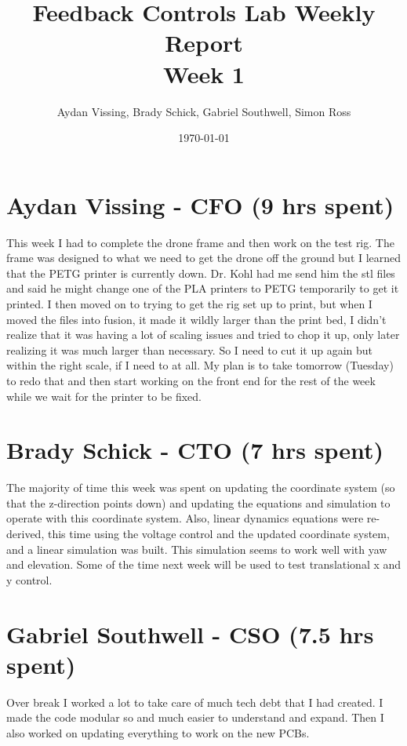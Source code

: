 \documentclass[12pt, titlepage]{article}
\title{Feedback Controls Lab Weekly Report \\ \normalsize{Week 1}}
\author{Aydan Vissing, Brady Schick, Gabriel Southwell, Simon Ross}
\date{\today}
\begin{document}
\maketitle

\section*{Aydan Vissing - CFO (9 hrs spent)}

This week I had to complete the drone frame and then work on the test rig. The frame was designed to what we need to get the drone off the ground but I learned that the PETG printer is currently down. Dr. Kohl had me send him the stl files and said he might change one of the PLA printers to PETG temporarily to get it printed. I then moved on to trying to get the rig set up to print, but when I moved the files into fusion, it made it wildly larger than the print bed, I didn't realize that it was having a lot of scaling issues and tried to chop it up, only later realizing it was much larger than necessary. So I need to cut it up again but within the right scale, if I need to at all. My plan is to take tomorrow (Tuesday) to redo that and then start working on the front end for the rest of the week while we wait for the printer to be fixed.

\section*{Brady Schick - CTO (7 hrs spent)}

The majority of time this week was spent on updating the coordinate system (so that the z-direction points down) and 
updating the equations and simulation to operate with this coordinate system. Also, linear dynamics equations were
re-derived, this time using the voltage control and the updated coordinate system, and a linear simulation was built.
This simulation seems to work well with yaw and elevation. Some of the time next week will be used to test translational
x and y control.

\section*{Gabriel Southwell - CSO (7.5 hrs spent)}

Over break I worked a lot to take care of much tech debt that I had created. I made the code modular so and much easier to understand and expand. Then I also worked on updating everything to work on the new PCBs.
\end{document}
